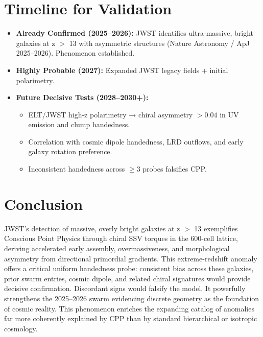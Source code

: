 \documentclass[11pt]{article}
\begin{document}
\section{Timeline for Validation}
\begin{itemize}
    \item \textbf{Already Confirmed (2025--2026):} JWST identifies ultra-massive, bright galaxies at z $>$ 13 with asymmetric structures (Nature Astronomy / ApJ 2025--2026). Phenomenon established.
    \item \textbf{Highly Probable (2027):} Expanded JWST legacy fields + initial polarimetry.
    \item \textbf{Future Decisive Tests (2028--2030+):}
    \begin{itemize}
        \item ELT/JWST high-z polarimetry → chiral asymmetry $>0.04$ in UV emission and clump handedness.
        \item Correlation with cosmic dipole handedness, LRD outflows, and early galaxy rotation preference.
        \item Inconsistent handedness across $\geq 3$ probes falsifies CPP.
    \end{itemize}
\end{itemize}

\section{Conclusion}
JWST's detection of massive, overly bright galaxies at z $>$ 13 exemplifies Conscious Point Physics through chiral SSV torques in the 600-cell lattice, deriving accelerated early assembly, overmassiveness, and morphological asymmetry from directional primordial gradients.  
This extreme-redshift anomaly offers a critical uniform handedness probe: consistent bias across these galaxies, prior swarm entries, cosmic dipole, and related chiral signatures would provide decisive confirmation. Discordant signs would falsify the model. It powerfully strengthens the 2025--2026 swarm evidencing discrete geometry as the foundation of cosmic reality.  
This phenomenon enriches the expanding catalog of anomalies far more coherently explained by CPP than by standard hierarchical or isotropic cosmology.
\end{document}
